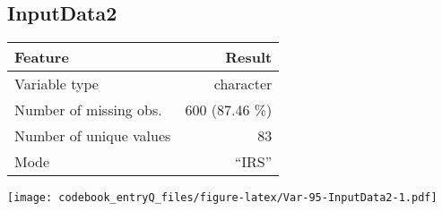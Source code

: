 \documentclass[]{article}
\newcommand{\fullline}{\noindent\makebox[\linewidth]{\rule{\textwidth}{0.4pt}}}
\newcommand{\bminione}{\begin{minipage}{0.75 \textwidth}}
\newcommand{\bminitwo}{\begin{minipage}{0.25 \textwidth}}
\newcommand{\emini}{\end{minipage}}
\begin{document}
\fullline

\hypertarget{inputdata2}{\subsection{InputData2}\label{inputdata2}}

\bminione

\begin{longtable}[]{@{}lr@{}}
\toprule
\begin{minipage}[b]{0.34\columnwidth}\raggedright\strut
Feature\strut
\end{minipage} & \begin{minipage}[b]{0.20\columnwidth}\raggedleft\strut
Result\strut
\end{minipage}\tabularnewline
\midrule
\endhead
\begin{minipage}[t]{0.34\columnwidth}\raggedright\strut
Variable type\strut
\end{minipage} & \begin{minipage}[t]{0.20\columnwidth}\raggedleft\strut
character\strut
\end{minipage}\tabularnewline
\begin{minipage}[t]{0.34\columnwidth}\raggedright\strut
Number of missing obs.\strut
\end{minipage} & \begin{minipage}[t]{0.20\columnwidth}\raggedleft\strut
600 (87.46 \%)\strut
\end{minipage}\tabularnewline
\begin{minipage}[t]{0.34\columnwidth}\raggedright\strut
Number of unique values\strut
\end{minipage} & \begin{minipage}[t]{0.20\columnwidth}\raggedleft\strut
83\strut
\end{minipage}\tabularnewline
\begin{minipage}[t]{0.34\columnwidth}\raggedright\strut
Mode\strut
\end{minipage} & \begin{minipage}[t]{0.20\columnwidth}\raggedleft\strut
``IRS''\strut
\end{minipage}\tabularnewline
\bottomrule
\end{longtable}

\emini
\bminitwo
\texttt{[image: codebook\_entryQ\_files/figure-latex/Var-95-InputData2-1.pdf]}
\emini
\end{document}
